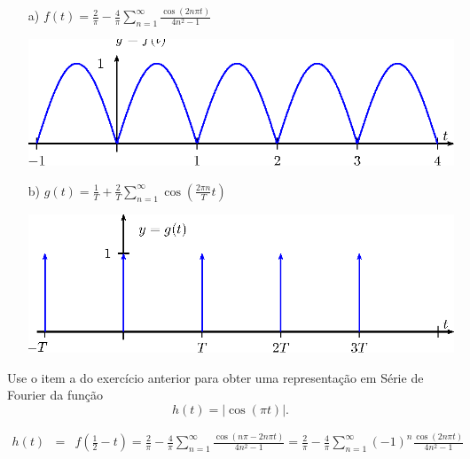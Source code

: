 \begin{Answer}
\begin{itemize}
 \item [a)] $f(t)=\frac{2}{\pi}- \frac{4}{\pi}\sum_{n=1}^\infty \frac{\cos(2n\pi t)}{4n^2-1}$
\begin{center}

\includegraphics{cap_series/pics/figura_6}\end{center}
 \item [b)] $g(t)=\frac{1}{T}+ \frac{2}{T} \sum_{n=1}^\infty \cos\left(\frac{2\pi n}{T} t\right)$
\begin{center}

\includegraphics{cap_series/pics/figura_7}\end{center}
 \end{itemize}
\end{Answer}
\begin{Exercise}{\label{Fourier_9}}
 Use o item a do exercício anterior para obter uma representação em Série de Fourier da função \begin{equation}h(t)=|\cos(\pi t)|.\end{equation}
\end{Exercise}
\begin{Answer}
 \begin{eqnarray*}
h(t)&=&f\left(\frac{1}{2}-t\right)=\frac{2}{\pi}- \frac{4}{\pi}\sum_{n=1}^\infty \frac{\cos\left(n\pi-2n\pi t\right)}{4n^2-1}=\frac{2}{\pi}- \frac{4}{\pi}\sum_{n=1}^\infty(-1)^n \frac{\cos\left(2n\pi t\right)}{4n^2-1}
 \end{eqnarray*}
\end{Answer}
